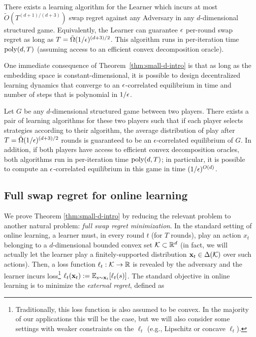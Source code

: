 \documentclass[final,12pt]{alt2025}
\begin{document}
\begin{theorem}\label{thm:small-d-intro}
There exists a learning algorithm for the Learner which incurs at most $\tilde{O}(T^{(d+1)/(d+3)})$ swap regret against any Adversary in any $d$-dimensional structured game. Equivalently, the Learner can guarantee $\epsilon$ per-round swap regret as long as $T = \tilde{\Omega}(1/\epsilon)^{(d+3)/2}$. This algorithm runs in per-iteration time $\operatorname{poly}(d, T)$ (assuming access to an efficient convex decomposition oracle).
\end{theorem}

One immediate consequence of Theorem~\ref{thm:small-d-intro} is that as long as the embedding space is constant-dimensional, it is possible to design decentralized learning dynamics that converge to an $\epsilon$-correlated equilibrium in time and number of steps that is polynomial in $1/\epsilon$.

\begin{corollary}\label{cor:correlated-equilibria}
Let $G$ be any $d$-dimensional structured game between two players.
There exists a pair of learning algorithms for these two players such that if each player selects strategies according to their algorithm, the average distribution of play after $T = \tilde{\Omega}(1/\epsilon)^{(d + 3)/2}$ rounds is guaranteed to be an $\epsilon$-correlated equilibrium of $G$. In addition, if both players have access to efficient convex decomposition oracles, both algorithms run in per-iteration time $\operatorname{poly}(d, T)$; in particular, it is possible to compute an $\epsilon$-correlated equilibrium in this game in time $(1/\epsilon)^{O(d)}$.
\end{corollary}

\subsection{Full swap regret for online learning}

We prove Theorem \ref{thm:small-d-intro} by reducing the relevant problem to another natural problem: \emph{full swap regret minimization}.  In the standard setting of online learning, a learner must, in every round $t$ (for $T$ rounds), play an action $x_t$ belonging to a $d$-dimensional bounded convex set $\mathcal{K} \subset \mathbb{R}^{d}$ (in fact, we will actually let the learner play a finitely-supported distribution $\mathbf{x}_t \in \Delta(\mathcal{K})$ over such actions).  Then, a loss function $\ell_t : \mathcal{K} \rightarrow \mathbb{R}$ is revealed by the adversary and the learner incurs loss\footnote{Traditionally, this loss function is also assumed to be convex. In the majority of our applications this will be the case, but we will also consider some settings with weaker constraints on the $\ell_t$ (e.g., Lipschitz or concave $\ell_t$).} $\ell_t(\mathbf{x}_t) := \mathbb{E}_{s \sim \mathbf{x}_t}[\ell_t(s)]$. The standard objective in online learning is to minimize the \emph{external regret}, defined as
\end{document}
